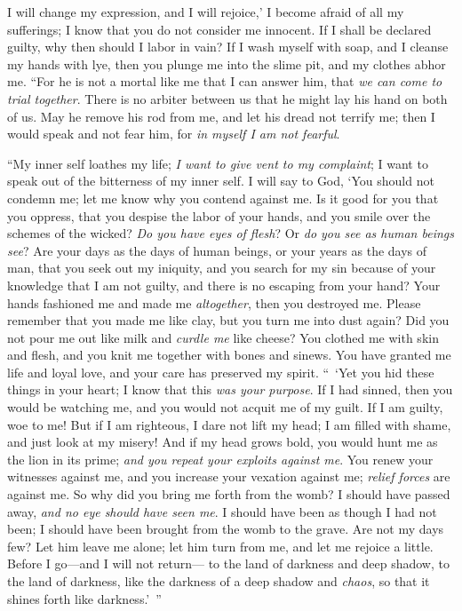 \begin{biblechapter}
I will change my expression, and I will rejoice,’
\verse I become afraid of all my sufferings; 
I know that you do not consider me innocent.
\verse If I shall be declared guilty, 
why then should I labor in vain?
\verse If I wash myself with soap, 
and I cleanse my hands with lye,
\verse then you plunge me into the slime pit, 
and my clothes abhor me.
\verse “For he is not a mortal like me that I can answer him, 
that \textit{we can come to trial together}.
\verse There is no arbiter between us 
that he might lay his hand on both of us.
\verse May he remove his rod from me, 
and let his dread not terrify me;
\verse then I would speak and not fear him, 
for \textit{in myself I am not fearful}.
\end{biblechapter}

\begin{biblechapter} %
 “My inner self loathes my life; 
\textit{I want to give vent to my complaint}; 
I want to speak out of the bitterness of my inner self.
\verse I will say to God, ‘You should not condemn me; 
let me know why you contend against me.
\verse Is it good for you that you oppress, 
that you despise the labor of your hands, 
and you smile over the schemes of the wicked?
\verse \textit{Do you have eyes of flesh}? 
Or \textit{do you see as human beings see}?
\verse Are your days as the days of human beings, 
or your years as the days of man,
\verse that you seek out my iniquity, 
and you search for my sin
\verse because of your knowledge that I am not guilty, 
and there is no escaping from your hand?
\verse Your hands fashioned me and made me \textit{altogether}, 
then you destroyed me.
\verse Please remember that you made me like clay, 
but you turn me into dust again?
\verse Did you not pour me out like milk 
and \textit{curdle me} like cheese?
\verse You clothed me with skin and flesh, 
and you knit me together with bones and sinews.
\verse You have granted me life and loyal love, 
and your care has preserved my spirit.
\verse “ ‘Yet you hid these things in your heart; 
I know that this \textit{was your purpose}.
\verse If I had sinned, then you would be watching me, 
and you would not acquit me of my guilt.
\verse If I am guilty, woe to me! 
But if I am righteous, I dare not lift my head; 
I am filled with shame, and just look at my misery!
\verse And if my head grows bold, you would hunt me as the lion in its prime; 
\textit{and you repeat your exploits against me}.
\verse You renew your witnesses against me, 
and you increase your vexation against me; 
\textit{relief forces} are against me.
\verse So why did you bring me forth from the womb? 
I should have passed away, \textit{and no eye should have seen me}.
\verse I should have been as though I had not been; 
I should have been brought from the womb to the grave.
\verse Are not my days few? Let him leave me alone; 
let him turn from me, and let me rejoice a little.
\verse Before I go—and I will not return— 
to the land of darkness and deep shadow,
\verse to the land of darkness, 
like the darkness of a deep shadow and \textit{chaos}, 
so that it shines forth like darkness.’ ”
\end{biblechapter}

